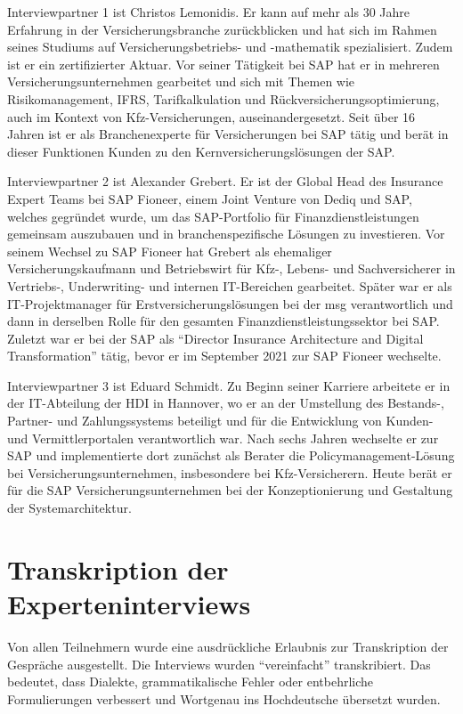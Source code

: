 Interviewpartner 1 ist Christos Lemonidis. Er kann auf mehr als 30 Jahre Erfahrung in der Versicherungsbranche zurückblicken und hat sich im Rahmen seines Studiums auf Versicherungsbetriebs- und -mathematik spezialisiert. Zudem ist er ein zertifizierter Aktuar. Vor seiner Tätigkeit bei SAP hat er in mehreren Versicherungsunternehmen gearbeitet und sich mit Themen wie Risikomanagement, IFRS, Tarifkalkulation und Rückversicherungsoptimierung, auch im Kontext von Kfz-Versicherungen, auseinandergesetzt. Seit über 16 Jahren ist er als Branchenexperte für Versicherungen bei SAP tätig und berät in dieser Funktionen Kunden zu den Kernversicherungslösungen der SAP.  

Interviewpartner 2 ist Alexander Grebert. Er ist der Global Head des Insurance Expert Teams bei SAP Fioneer, einem Joint Venture von Dediq und SAP, welches gegründet wurde, um das SAP-Portfolio für Finanzdienstleistungen gemeinsam auszubauen und in branchenspezifische Lösungen zu investieren. Vor seinem Wechsel zu SAP Fioneer hat Grebert als ehemaliger Versicherungskaufmann und Betriebswirt für Kfz-, Lebens- und Sachversicherer in Vertriebs-, Underwriting- und internen IT-Bereichen gearbeitet. Später war er als IT-Projektmanager für Erstversicherungslösungen bei der msg verantwortlich und dann in derselben Rolle für den gesamten Finanzdienstleistungssektor bei SAP. Zuletzt war er bei der SAP als \enquote{Director Insurance Architecture and Digital Transformation} tätig, bevor er im September 2021 zur SAP Fioneer wechselte.

Interviewpartner 3 ist Eduard Schmidt. Zu Beginn seiner Karriere arbeitete er in der IT-Abteilung der HDI in Hannover, wo er an der Umstellung des Bestands-, Partner- und Zahlungssystems beteiligt und für die Entwicklung von Kunden- und Vermittlerportalen verantwortlich war. Nach sechs Jahren wechselte er zur SAP und implementierte dort zunächst als Berater die Policymanagement-Lösung bei Versicherungsunternehmen, insbesondere bei Kfz-Versicherern. Heute berät er für die SAP Versicherungsunternehmen bei der Konzeptionierung und Gestaltung der Systemarchitektur.

\section{Transkription der Experteninterviews}

Von allen Teilnehmern wurde eine ausdrückliche Erlaubnis zur Transkription der Gespräche ausgestellt. Die Interviews wurden \enquote{vereinfacht} transkribiert. Das bedeutet, dass Dialekte, grammatikalische Fehler oder entbehrliche Formulierungen verbessert und Wortgenau ins Hochdeutsche übersetzt wurden.

